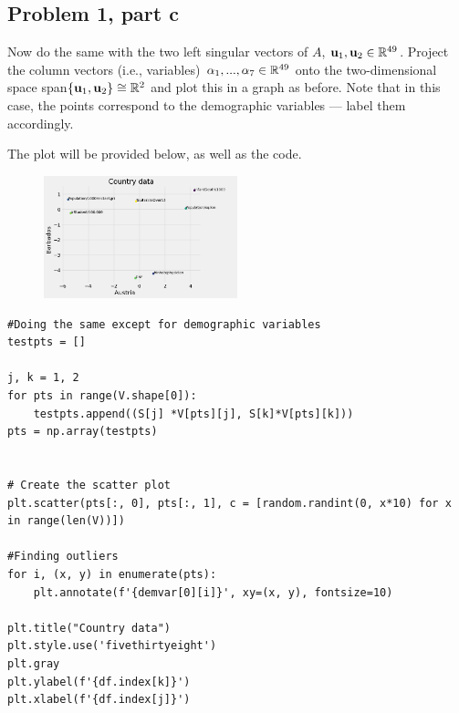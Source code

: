 \subsection{Problem 1, part c}
Now do the same with the two left singular vectors of $A$, $\textbf{u}_1, \textbf{u}_2 \in \mathbb{R}^{49}$. Project the column vectors (i.e., variables) $\alpha_1, ..., \alpha_7 \in \mathbb{R}^{49}$ onto the two-dimensional space span$\{\textbf{u}_1, \textbf{u}_2\} \cong \mathbb{R}^2$ and plot this in a graph as before. Note that in this case, the points correspond to the demographic variables — label them accordingly.
\partbreak
\begin{solution}

The plot will be provided below, as well as the code. 

\begin{figure}[h]
    \centering
    \includegraphics[width = 0.5\textwidth]{Images/problem 1c plot.png}
    \label{fig:problem1c}
\end{figure}

\begin{lstlisting}
#Doing the same except for demographic variables
testpts = []

j, k = 1, 2
for pts in range(V.shape[0]):
    testpts.append((S[j] *V[pts][j], S[k]*V[pts][k]))
pts = np.array(testpts)


# Create the scatter plot
plt.scatter(pts[:, 0], pts[:, 1], c = [random.randint(0, x*10) for x in range(len(V))])

#Finding outliers
for i, (x, y) in enumerate(pts):
    plt.annotate(f'{demvar[0][i]}', xy=(x, y), fontsize=10)

plt.title("Country data")
plt.style.use('fivethirtyeight')
plt.gray
plt.ylabel(f'{df.index[k]}')
plt.xlabel(f'{df.index[j]}')
\end{lstlisting}
\end{solution}

\newpage
